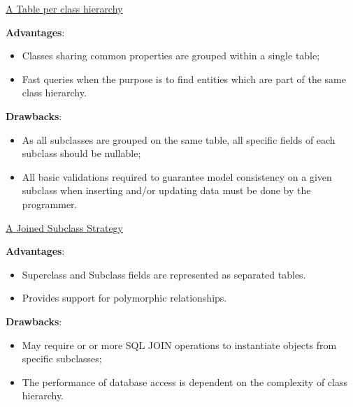 \documentclass[xcolor=x11names,compress]{beamer}
\renewcommand{\(}{\begin{columns}}
\renewcommand{\)}{\end{columns}}
\newcommand{\<}[1]{\begin{column}{#1}}
\renewcommand{\>}{\end{column}}
\begin{document}
\begin{frame}{\underline{A Table per class hierarchy}}
\justifying

\textbf{Advantages}:

\begin{itemize}
\itemsep 12pt
\justifying
\item Classes sharing common properties are grouped within a single table;

\item Fast queries when the purpose is to find entities which are part of the same class hierarchy.

\end{itemize}

\textbf{Drawbacks}:
\begin{itemize}
\itemsep 12pt
\justifying
\item As all subclasses are grouped on the same table, all specific fields of each subclass should be nullable; 
\item All basic validations required to guarantee model consistency on a given subclass when inserting and/or updating data must be done by the programmer.

\end{itemize}
\end{frame}

\begin{frame}{\underline{A Joined Subclass Strategy}}
\justifying

\textbf{Advantages}:

\begin{itemize}
\itemsep 12pt
\justifying
\item Superclass and Subclass fields are represented as separated tables.

\item Provides support for polymorphic relationships.

\end{itemize}

\textbf{Drawbacks}:
\begin{itemize}
\itemsep 12pt
\justifying
\item May require or or more SQL JOIN operations to instantiate objects from specific subclasses;
\item The performance of database access is dependent on the complexity of class hierarchy.

\end{itemize}
\end{frame}
\end{document}
